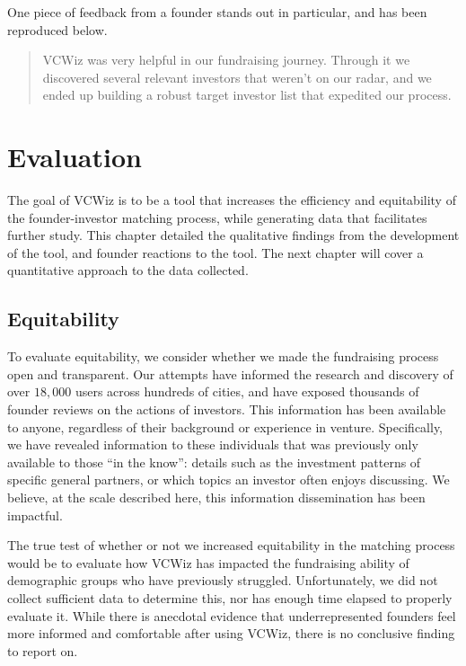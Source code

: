 One piece of feedback from a founder stands out in particular, and has been reproduced below.

\begin{quote}
VCWiz was very helpful in our fundraising journey. Through it we discovered several relevant investors that weren't on our radar, and we ended up building a robust target investor list that expedited our process.
\end{quote}

\section{Evaluation}

The goal of VCWiz is to be a tool that increases the efficiency and equitability of the founder-investor matching process, while generating data that facilitates further study. This chapter detailed the qualitative findings from the development of the tool, and founder reactions to the tool. The next chapter will cover a quantitative approach to the data collected.

\subsection{Equitability}

To evaluate equitability, we consider whether we made the fundraising process open and transparent. Our attempts have informed the research and discovery of over $18,000$ users across hundreds of cities, and have exposed thousands of founder reviews on the actions of investors. This information has been available to anyone, regardless of their background or experience in venture. Specifically, we have revealed information to these individuals that was previously only available to those ``in the know'': details such as the investment patterns of specific general partners, or which topics an investor often enjoys discussing. We believe, at the scale described here, this information dissemination has been impactful.

The true test of whether or not we increased equitability in the matching process would be to evaluate how VCWiz has impacted the fundraising ability of demographic groups who have previously struggled. Unfortunately, we did not collect sufficient data to determine this, nor has enough time elapsed to properly evaluate it. While there is anecdotal evidence that underrepresented founders feel more informed and comfortable after using VCWiz, there is no conclusive finding to report on.

